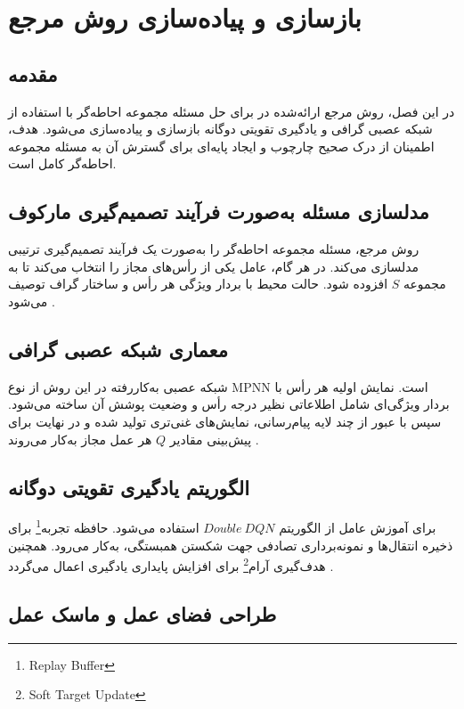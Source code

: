 \chapter{بازسازی و پیاده‌سازی روش مرجع}
\label{ch:reference}

\section{مقدمه}

در این فصل، روش مرجع ارائه‌شده در \cite{chen2024dsp} برای حل مسئله مجموعه احاطه‌گر با استفاده از شبکه عصبی گرافی و یادگیری تقویتی دوگانه بازسازی و پیاده‌سازی می‌شود. هدف، اطمینان از درک صحیح چارچوب و ایجاد پایه‌ای برای گسترش آن به مسئله مجموعه احاطه‌گر کامل است.

\section{مدلسازی مسئله به‌صورت فرآیند تصمیم‌گیری مارکوف}

روش مرجع، مسئله مجموعه احاطه‌گر را به‌صورت یک فرآیند تصمیم‌گیری ترتیبی مدلسازی می‌کند. در هر گام، عامل یکی از رأس‌های مجاز را انتخاب می‌کند تا به مجموعه $S$ افزوده شود. حالت محیط با بردار ویژگی هر رأس و ساختار گراف توصیف می‌شود \cite{chen2024dsp}.

\section{معماری شبکه عصبی گرافی}

شبکه عصبی به‌کاررفته در این روش از نوع MPNN است. نمایش اولیه هر رأس با بردار ویژگی‌ای شامل اطلاعاتی نظیر درجه رأس و وضعیت پوشش آن ساخته می‌شود. سپس با عبور از چند لایه پیام‌رسانی، نمایش‌های غنی‌تری تولید شده و در نهایت برای پیش‌بینی مقادیر $Q$ هر عمل مجاز به‌کار می‌روند \cite{gilmer2017mpnn, chen2024dsp}.

\section{الگوریتم یادگیری تقویتی دوگانه}

برای آموزش عامل از الگوریتم $Double\ DQN$ استفاده می‌شود. حافظه تجربه\footnote{Replay Buffer} برای ذخیره انتقال‌ها و نمونه‌برداری تصادفی جهت شکستن همبستگی، به‌کار می‌رود. همچنین هدف‌گیری آرام\footnote{Soft Target Update} برای افزایش پایداری یادگیری اعمال می‌گردد \cite{vanhasselt2016ddqn, mnih2015human}.

\section{طراحی فضای عمل و ماسک عمل}

